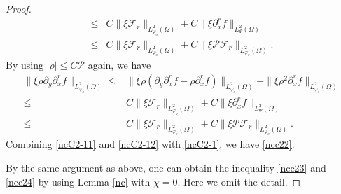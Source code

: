 \documentclass{amsart}
\numberwithin{equation}{section}
\begin{document}
\begin{proof}
\begin{align}
\leq& C\|\xi\mathcal{F}_{r}\|_{L_{\varphi_{o}}^{2}(\Omega)}
     +C\|\xi\partial_{x}^{r}f\|_{L_{\Psi}^{2}(\Omega)}\nonumber\\
\leq& C\|\xi\mathcal{F}_{r}\|_{L_{\varphi_{o}}^{2}(\Omega)}
     +C\|\xi\mathcal{P}\mathcal{F}_{r}\|_{L_{\varphi_{o}}^{2}(\Omega)}.\nonumber
\end{align}
By using $|\rho|\leq C\mathcal{P}$ again, we have
\begin{align}\label{ncC2-12}
\|\xi\rho\partial_{y}\partial_{x}^{r}f\|_{L_{\varphi_{o}}^{2}(\Omega)}
\leq& \|\xi\rho(\partial_{y}\partial_{x}^{r}f-\rho\partial_{x}^{r}f)\|_{L_{\varphi_{o}}^{2}(\Omega)}
     +\|\xi\rho^{2}\partial_{x}^{r}f\|_{L_{\varphi_{o}}^{2}(\Omega)}\\
\leq& C\|\xi\mathcal{F}_{r}\|_{L_{\varphi_{o}}^{2}(\Omega)}
     +C\|\xi\partial_{x}^{r}f\|_{L_{\Psi}^{2}(\Omega)}\nonumber\\
\leq& C\|\xi\mathcal{F}_{r}\|_{L_{\varphi_{o}}^{2}(\Omega)}
     +C\|\xi\mathcal{P}\mathcal{F}_{r}\|_{L_{\varphi_{o}}^{2}(\Omega)}.\nonumber
\end{align}
Combining \eqref{ncC2-11} and \eqref{ncC2-12} with \eqref{ncC2-1}, we have \eqref{ncc22}.

By the same argument as above, one can obtain the inequality \eqref{ncc23} and \eqref{ncc24} by using Lemma \ref{nc} with $\tilde{\chi}=0$. Here we omit the detail.
\end{proof}
\end{document}
